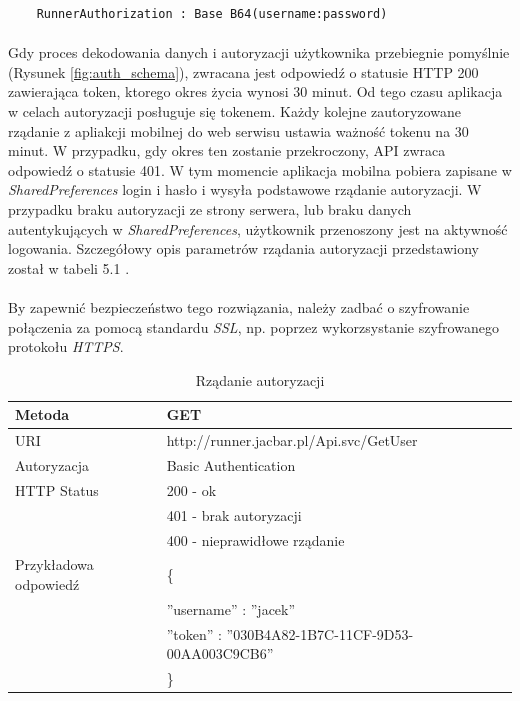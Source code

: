 
\begin{lstlisting}
	RunnerAuthorization : Base B64(username:password)
\end{lstlisting}

\paragraph{} %
\label{par:}
Gdy proces dekodowania danych i autoryzacji użytkownika przebiegnie pomyślnie (Rysunek \ref{fig:auth_schema}), zwracana jest odpowiedź o statusie HTTP 200 zawierająca token, ktorego okres życia wynosi 30 minut. Od tego czasu aplikacja w celach autoryzacji posługuje się tokenem. Każdy kolejne zautoryzowane rządanie z apliakcji mobilnej do web serwisu ustawia ważność tokenu na 30 minut. W przypadku, gdy okres ten zostanie przekroczony, API zwraca odpowiedź o statusie 401. W tym momencie aplikacja mobilna pobiera zapisane w \textit{SharedPreferences} login i hasło i wysyła podstawowe rządanie autoryzacji. W przypadku braku autoryzacji ze strony serwera, lub braku danych autentykujących w \textit{SharedPreferences}, użytkownik przenoszony jest na aktywność logowania. Szczegółowy opis parametrów rządania autoryzacji przedstawiony został w tabeli 5.1 .

\paragraph{} %
\label{par:}
By zapewnić bezpieczeństwo tego rozwiązania, należy zadbać o szyfrowanie połączenia za pomocą standardu \textit{SSL}, np. poprzez wykorzsystanie szyfrowanego protokołu \textit{HTTPS}.
\begin{table}
 \label{tab:aut}
  \caption{Rządanie autoryzacji}
  \begin{center}
  \begin{tabular}{| l | l |}
  	\hline
  	Metoda & GET \\ \hline
  	URI & http://runner.jacbar.pl/Api.svc/GetUser \\ \hline
  	Autoryzacja & Basic Authentication \\ \hline
  	HTTP Status & 200 - ok \\
                & 401 - brak autoryzacji \\
                & 400 - nieprawidłowe rządanie \\ \hline
    Przykładowa odpowiedź & \{ \\
                          & \quad ''username'' : ''jacek'' \\
                          & \quad ''token'' : ''030B4A82-1B7C-11CF-9D53-00AA003C9CB6'' \\
                          & \} \\ \hline
  \end{tabular}
  \end{center}
\end{table}

